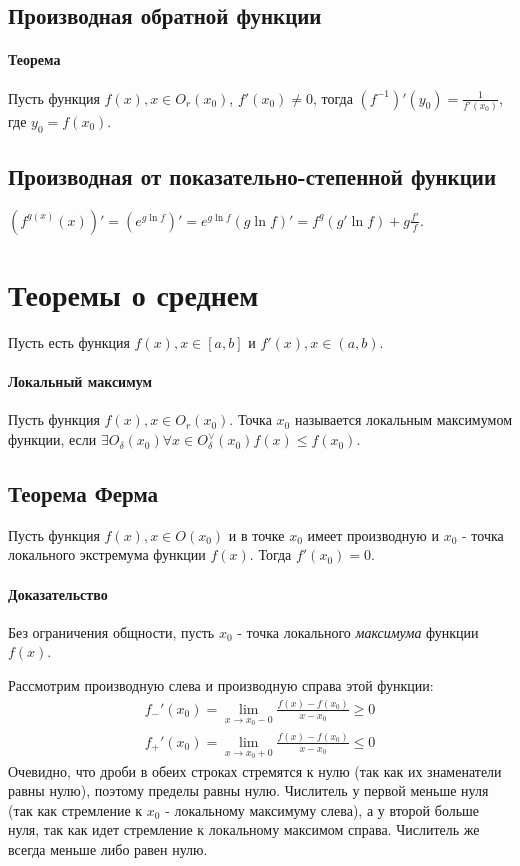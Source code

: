 \documentclass[10pt]{article}
\newcommand{\limx}[1]{\lim\limits_{x \to #1}}
\begin{document}
			\subsection{Производная обратной функции}
				\paragraph{Теорема}
				Пусть функция $f(x), x \in O_r(x_0)$, $f'(x_0) \neq 0$, тогда $(f^{-1})'(y_0) = \frac{1}{f'(x_0)}$, где $y_0 = f(x_0)$.
			\subsection{Производная от показательно-степенной функции}
				$(f^{g(x)}(x))' = (e^{g\ln f})' = e^{g\ln f}(g\ln f)' = f^g(g'\ln f) + g\frac{f'}{f}$.
		
		\section{Теоремы о среднем}
			Пусть есть функция $f(x), x \in [a, b]$ и $f'(x), x \in (a, b)$.
			\paragraph{Локальный максимум}
				Пусть функция $f(x), x \in O_r(x_0)$. Точка $x_0$ называется локальным максимумом функции, если $\exists O_\delta(x_0) \forall x \in O_\delta^\vee(x_0) f(x) \leq f(x_0)$.
			\subsection{Теорема Ферма}
			Пусть функция $f(x), x \in O(x_0)$ и в точке $x_0$ имеет производную и $x_0$ - точка локального экстремума функции $f(x)$. Тогда $f'(x_0) = 0$.
				\paragraph{Доказательство}
					Без ограничения общности, пусть $x_0$ - точка локального \textit{максимума} функции $f(x)$.
					
					Рассмотрим производную слева и производную справа этой функции:
					\begin{eqnarray}
						\nonumber f_-'(x_0) = \limx{x_0 - 0} \frac{f(x) - f(x_0)}{x - x_0} \geq 0\\
						\nonumber f_+'(x_0) = \limx{x_0 + 0} \frac{f(x) - f(x_0)}{x - x_0} \leq 0
					\end{eqnarray} Очевидно, что дроби в обеих строках стремятся к нулю (так как их знаменатели равны нулю), поэтому пределы равны нулю. Числитель у первой меньше нуля (так как стремление к $x_0$ - локальному максимуму слева), а у второй больше нуля, так как идет стремление к локальному максимом справа. Числитель же всегда меньше либо равен нулю.
					
\end{document}

